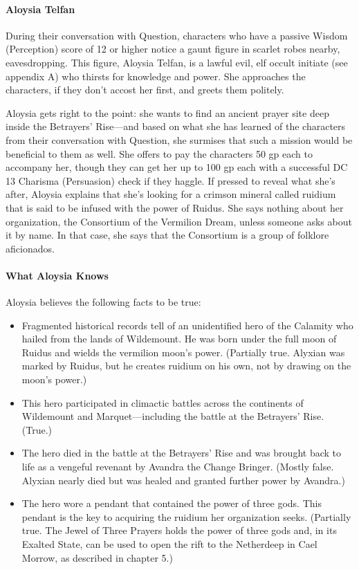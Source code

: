 \documentclass[10pt,a4paper,twoside,twocolumn,openany,nodeprecatedcode]{dndbook}
\begin{document}
\paragraph{Aloysia Telfan}
During their conversation with Question, characters who have a passive Wisdom (Perception) score of 12 or higher notice a gaunt figure in scarlet robes nearby, eavesdropping. This figure, Aloysia Telfan, is a lawful evil, elf occult initiate (see appendix A) who thirsts for knowledge and power. She approaches the characters, if they don't accost her first, and greets them politely.

Aloysia gets right to the point: she wants to find an ancient prayer site deep inside the Betrayers' Rise—and based on what she has learned of the characters from their conversation with Question, she surmises that such a mission would be beneficial to them as well. She offers to pay the characters 50 gp each to accompany her, though they can get her up to 100 gp each with a successful DC 13 Charisma (Persuasion) check if they haggle. If pressed to reveal what she's after, Aloysia explains that she's looking for a crimson mineral called ruidium that is said to be infused with the power of Ruidus. She says nothing about her organization, the Consortium of the Vermilion Dream, unless someone asks about it by name. In that case, she says that the Consortium is a group of folklore aficionados.

\paragraph{What Aloysia Knows}
Aloysia believes the following facts to be true:


\begin{itemize}
\item Fragmented historical records tell of an unidentified hero of the Calamity who hailed from the lands of Wildemount. He was born under the full moon of Ruidus and wields the vermilion moon's power. (Partially true. Alyxian was marked by Ruidus, but he creates ruidium on his own, not by drawing on the moon's power.)
\item This hero participated in climactic battles across the continents of Wildemount and Marquet—including the battle at the Betrayers' Rise. (True.)
\item The hero died in the battle at the Betrayers' Rise and was brought back to life as a vengeful revenant by Avandra the Change Bringer. (Mostly false. Alyxian nearly died but was healed and granted further power by Avandra.)
\item The hero wore a pendant that contained the power of three gods. This pendant is the key to acquiring the ruidium her organization seeks. (Partially true. The Jewel of Three Prayers holds the power of three gods and, in its Exalted State, can be used to open the rift to the Netherdeep in Cael Morrow, as described in chapter 5.)
\end{itemize}
\end{document}
